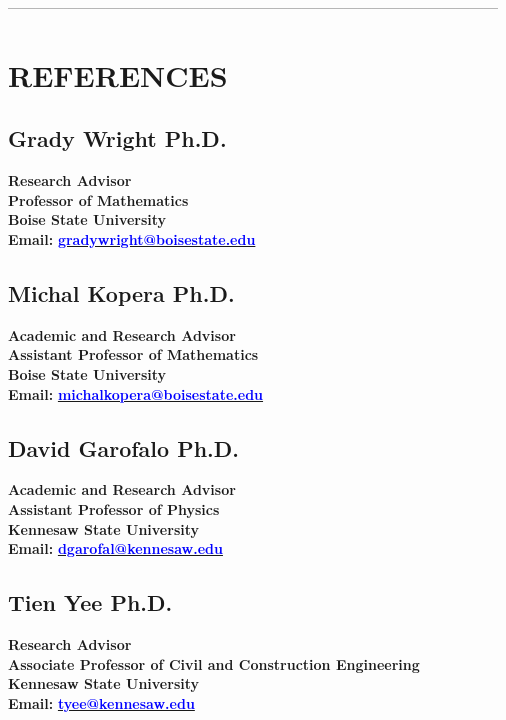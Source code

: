 \documentclass[margin, 10pt]{res} %
\begin{document}
\begin{resume}
---------------------------------------------------------------------------------------------------------

\section{REFERENCES}

\subsection{Grady Wright Ph.D.}
\textbf{Research Advisor} \\
\textbf{Professor of Mathematics} \\
\textbf{Boise State University} \\
\textbf{Email:} \href{mailto:gradywright@boisestate.edu}{\textcolor{blue}{\textbf{gradywright@boisestate.edu}}}

\subsection{Michal Kopera Ph.D.}
\textbf{Academic and Research Advisor} \\
\textbf{Assistant Professor of Mathematics} \\
\textbf{Boise State University} \\
\textbf{Email:} \href{mailto:michalkopera@boisestate.edu}{\textcolor{blue}{\textbf{michalkopera@boisestate.edu}}}

\subsection{David Garofalo Ph.D.}
\textbf{Academic and Research Advisor} \\
\textbf{Assistant Professor of Physics} \\
\textbf{Kennesaw State University} \\
\textbf{Email:} \href{mailto:dgarofal@kennesaw.edu}{\textcolor{blue}{\textbf{dgarofal@kennesaw.edu}}}

\subsection{Tien Yee Ph.D.}
\textbf{Research Advisor} \\
\textbf{Associate Professor of Civil and Construction Engineering} \\ 
\textbf{Kennesaw State University} \\
\textbf{Email:} \href{mailto:tyee@kennesaw.edu}{\textcolor{blue}{\textbf{tyee@kennesaw.edu}}}


\end{resume}
\end{document}
